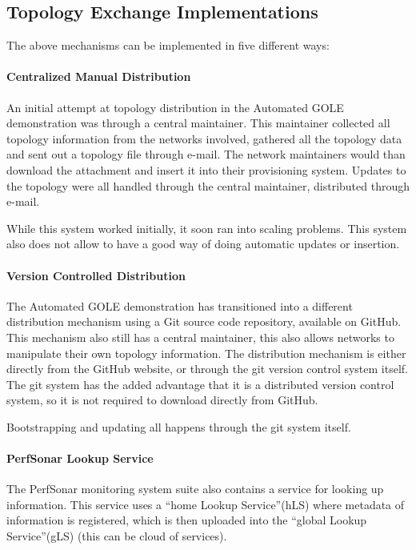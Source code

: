 \documentclass[12pt]{article}  %
\begin{document}
\subsection{Topology Exchange Implementations}

 The above mechanisms can be implemented in five different ways:


\paragraph{Centralized Manual Distribution}
 An initial attempt at topology distribution in the Automated GOLE 
demonstration was through a central maintainer. This maintainer collected all topology 
information from the networks involved, gathered all the topology data and sent 
out a topology file through e-mail. The network maintainers would than download 
the attachment and insert it into their provisioning system. Updates to the topology 
were all handled through the central maintainer, distributed through e-mail.\label{h.31tbtceozcoc}


While this system worked initially, it soon ran into 
scaling problems. This system also does not allow to have a good way of doing automatic 
updates or insertion.


\paragraph{Version Controlled Distribution}

 The Automated GOLE demonstration has transitioned into a different 
distribution mechanism using a Git source code repository, available on GitHub. 
This mechanism also still has a central maintainer, this also allows networks to 
manipulate their own topology information. The distribution mechanism is either 
directly from the GitHub website, or through the git version control system itself. 
The git system has the added advantage that it is a distributed version control 
system, so it is not required to download directly from GitHub.\label{h.rtljwvhj8cbo}


Bootstrapping and updating all happens through the 
git system itself.


\paragraph{PerfSonar Lookup Service}

 The PerfSonar monitoring system suite also contains a service 
for looking up information. This service uses a ``home Lookup Service''(hLS) where 
metadata of information is registered, which is then uploaded into the ``global 
Lookup Service''(gLS) (this can be cloud of services).\label{h.pg14lxc0zu6o}
\end{document}
